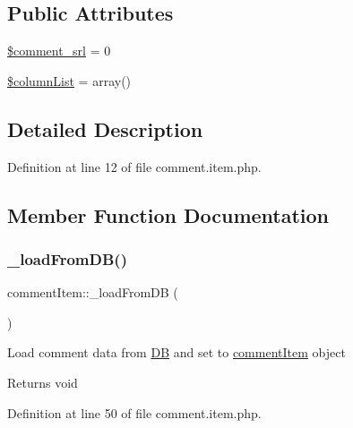 \subsection*{Public Attributes}
\begin{DoxyCompactItemize}
\item 
\hyperlink{classcommentItem_aec6b057a6e1e71a7b1441fe12682af3b}{\$comment\+\_\+srl} = 0
\item 
\hyperlink{classcommentItem_ad9849e9711f1458b25cf7775336bd6cd}{\$column\+List} = array()
\end{DoxyCompactItemize}


\subsection{Detailed Description}


Definition at line 12 of file comment.\+item.\+php.



\subsection{Member Function Documentation}
\mbox{\label{classcommentItem_a0c2c15c69b3584aadf79446147752d80}} 
\subsubsection{\texorpdfstring{\+\_\+load\+From\+D\+B()}{\_loadFromDB()}}
{\footnotesize\ttfamily comment\+Item\+::\+\_\+load\+From\+DB (\begin{DoxyParamCaption}{ }\end{DoxyParamCaption})}

Load comment data from \hyperlink{classDB}{DB} and set to \hyperlink{classcommentItem}{comment\+Item} object \begin{DoxyReturn}{Returns}
void 
\end{DoxyReturn}


Definition at line 50 of file comment.\+item.\+php.

\mbox{\label{classcommentItem_a5635b46a07b8788e7d2c31ed5b6968d2}} 
